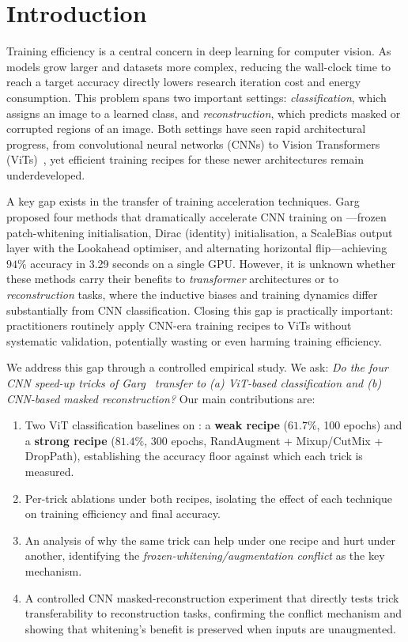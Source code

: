 \section{Introduction}\label{sec:intro}

Training efficiency is a central concern in deep learning for computer vision.
As models grow larger and datasets more complex, reducing the wall-clock time to reach a target accuracy directly lowers research iteration cost and energy consumption.
This problem spans two important settings: \emph{classification}, which assigns an image to a learned class, and \emph{reconstruction}, which predicts masked or corrupted regions of an image.
Both settings have seen rapid architectural progress, from convolutional neural networks (CNNs) to Vision Transformers (ViTs)~\cite{dosovitskiy2021vit}, yet efficient training recipes for these newer architectures remain underdeveloped.

A key gap exists in the transfer of training acceleration techniques.
Garg~\etal~\cite{garg2024cifar10} proposed four methods that dramatically accelerate CNN training on \cifar{}---frozen patch-whitening initialisation, Dirac (identity) initialisation, a ScaleBias output layer with the Lookahead optimiser, and alternating horizontal flip---achieving $94\%$ accuracy in 3.29 seconds on a single {GPU}.
However, it is unknown whether these methods carry their benefits to \emph{transformer} architectures or to \emph{reconstruction} tasks, where the inductive biases and training dynamics differ substantially from CNN classification.
Closing this gap is practically important: practitioners routinely apply CNN-era training recipes to ViTs without systematic validation, potentially wasting or even harming training efficiency.

We address this gap through a controlled empirical study.
We ask: \emph{Do the four CNN speed-up tricks of Garg~\etal{} transfer to (a) ViT-based classification and (b) CNN-based masked reconstruction?}
Our main contributions are:
\begin{enumerate}[leftmargin=*,topsep=2pt,itemsep=1pt]
    \item Two ViT classification baselines on \cifar{}: a \textbf{weak recipe} ($61.7\%$, 100 epochs) and a \textbf{strong recipe} ($81.4\%$, 300 epochs, RandAugment + Mixup/CutMix + DropPath), establishing the accuracy floor against which each trick is measured.
    \item Per-trick ablations under both recipes, isolating the effect of each technique on training efficiency and final accuracy.
    \item An analysis of why the same trick can help under one recipe and hurt under another, identifying the \emph{frozen-whitening/augmentation conflict} as the key mechanism.
    \item A controlled CNN masked-reconstruction experiment that directly tests trick transferability to reconstruction tasks, confirming the conflict mechanism and showing that whitening's benefit is preserved when inputs are unaugmented.
\end{enumerate}

